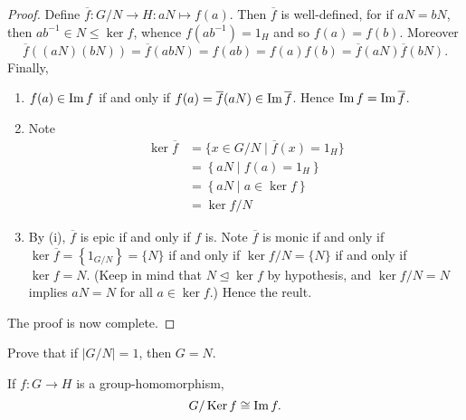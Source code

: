 \documentclass[11pt,a4paper]{article}
\begin{document}
\begin{proof}
Define \(\overline{f}\colon G/N \to H: aN\mapsto f(a    )\).
Then \(\overline{f} \) is well-defined, for if \(aN = bN\), then \(ab^{-1}\in N\leq \ker f\), whence \(f(ab^{-1}) =  1_H\) and so \(f(a) = f(b)\).
Moreover \[\overline{f}((aN)(bN)) = \overline{f}(abN) = f(ab) = f(a)f(b) = \overline{f}(aN) \overline{f}(bN).\]
Finally, 
\begin{enumerate}[label=(\roman*)]
    \item  \(f(a)\in\operatorname{Im} f \) if and only if  \(f(a) = \overline{f}(aN)  \in \operatorname{Im} \overline{f} \). Hence \(\operatorname{Im} f = \operatorname{Im} \overline{f}\).
\item 
    Note 
    \begin{align*}
        \ker \overline{f} &= \{x\in G/N \mid \overline{f}(x) = 1_H\}\\
        &= \left\{  aN \mid f(a) = 1_H \right\}\\
        &= \left\{ aN \mid a\in \ker f \right\}\\
        &= \ker f / N
    \end{align*}

    \item By (i), \(\overline{f} \) is epic if and only if \(f\) is.
     Note 
    \(\overline{f}\) is monic if and only if \(\ker \overline{f} = \left\{ 1_{G/N} \right\}   = \{ N\} \) if and only if \(\ker f / N  = \{N\}\) if and only if \(\ker f = N\).
    (Keep in mind that \(N\unlhd \ker f\) by hypothesis, and \(\ker f / N = N\)  implies \(aN  = N\) for all \(a \in \ker f\).) 
    Hence the reult.
\end{enumerate}
The proof is now complete.
\end{proof}


\begin{eje}
    Prove that if \(|G/N| = 1\), then \(G = N\).
\end{eje}

 

\begin{cor}
If \(f\colon G\to H\) is a group-homomorphism,  
\[G/ \operatorname{Ker} f  \cong \operatorname{Im} f.\]
    
\end{cor}
\end{document}
